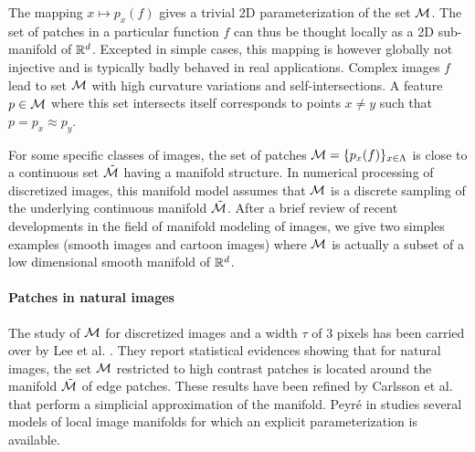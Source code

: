 \documentclass[final]{siamltex}
\newcommand{\manilift}{\phi_f}
\newcommand{\lifted}{\tilde f}
\begin{document}
The mapping $x \mapsto p_x(f)$ gives a trivial 2D parameterization of the set $\mathcal{M}$. The set of patches in a particular function $f$ can thus be thought locally as a 2D sub-manifold of $\mathbb{R}^d$. Excepted in simple cases, this mapping is however globally not injective and is typically badly behaved in real applications. Complex images $f$ lead to set $\mathcal{M}$ with high curvature variations and self-intersections. A feature $p \in \mathcal{M}$ where this set intersects itself corresponds to points $x \neq y$ such that $p = p_x \approx p_y$. 



For some specific classes of images, the set of patches $\mathcal{M} = \{p_x(f)\}_{x \in \Lambda}$ is close to a continuous set $\tilde {\mathcal{M}}$ having a manifold structure. In numerical processing of discretized images, this manifold model assumes that $\mathcal{M}$ is a discrete sampling of the underlying continuous manifold $\tilde {\mathcal{M}}$. After a brief review of recent developments in the field of manifold modeling of images, we give two simples examples (smooth images and cartoon images) where $\mathcal{M}$ is actually a subset of a low dimensional smooth manifold of $\mathbb{R}^d$.

\paragraph{Patches in natural images}

The study of $\mathcal{M}$ for discretized images and a width $\tau$ of 3 pixels has been carried over by Lee et al. \cite{lee-non-linear-stats}. They report statistical evidences showing that for natural images, the set $\mathcal{M}$ restricted to high contrast patches is located around the manifold $\tilde {\mathcal{M}}$ of edge patches. These results have been refined by Carlsson et al. \cite{carlsson-topological,carlsson-local-behavior} that perform a simplicial approximation of the manifold. Peyr\'e in \cite{peyre-manifold-models} studies several models of local image manifolds for which an explicit parameterization is available.
\end{document}
